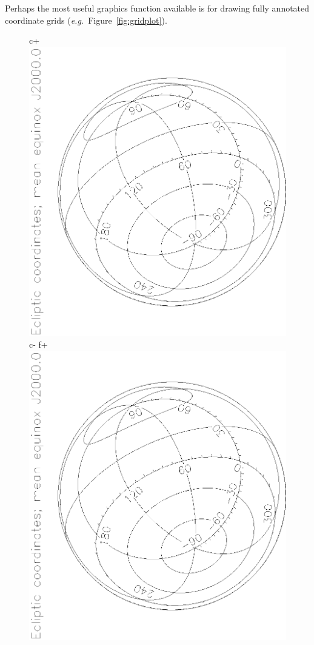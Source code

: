 \documentclass[twoside,11pt]{article}
\newenvironment{latexonly}{}{}
\begin{document}
{\begin{latexonly}
   Perhaps the most useful graphics function available is for drawing
   fully annotated coordinate grids ({\em{e.g.}}\ Figure~\ref{fig:gridplot}).
   \begin{figure}
   \begin{center}
c+
   \includegraphics[scale=0.8,angle=-90]{sun211_figures/gridplot_bw.eps}
c-
f+
   \includegraphics[scale=0.8,angle=-90]{sun210_figures/gridplot_bw.eps}

\end{center}
\end{figure}
\end{latexonly}}
\end{document}
